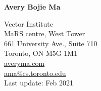 \documentclass[11pt,letterpaper]{article}
\begin{document}
\raggedright

  {\bfseries\Huge{Avery Bojie Ma}}
  \vspace{10pt}

  {\small
    Vector Institute\\
    MaRS centre, West Tower\\
    661 University Ave., Suite 710\\
    Toronto, ON M5G 1M1\\
    \vspace{-1pt}
    \href{http://averyma.com}{averyma.com}\\
    \vspace{-2pt}
    \href{mailto:ama@cs.toronto.edu}{ama@cs.toronto.edu}
    \vspace{-3pt}\\
    Last update: Feb 2021
  }
  

\end{document}
